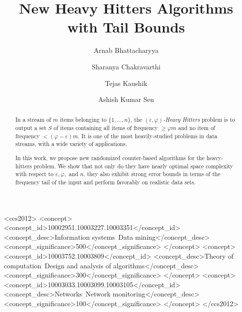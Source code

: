 \documentclass[sigconf,review=true,anonymous=true,screen]{acmart}
\newcommand{\eps}{\varepsilon}
\renewcommand{\phi}{\varphi}
\begin{document}
%
\title{New Heavy Hitters Algorithms with Tail Bounds}

%
\author{Arnab Bhattacharyya}
\author{Sharanya Chakravarthi}
\author{Tejas Kaushik}
\author{Ashish Kumar Sen}
%
\renewcommand{\shortauthors}{Bhattacharyya et al.}

%
\begin{abstract}
In a stream of $m$ items belonging to $\{1, \dots, n\}$, the {\em $(\eps, \phi)$-Heavy Hitters} problem is to output a set $S$ of items containing all items of frequency $\geq \phi m$ and no item of frequency $< (\phi-\eps)m$. It is one of the most heavily-studied problems in data streams, with a wide variety of applications. 

In this work, we propose new randomized counter-based algorithms for the heavy-hitters problem. We show that not only do they have nearly optimal space complexity with respect to $\eps, \phi,$ and $n$, they also exhibit strong error bounds in terms of the frequency tail of the input and perform favorably on realistic data sets.
\end{abstract}

%
%
\begin{CCSXML}
<ccs2012>
<concept>
<concept_id>10002951.10003227.10003351</concept_id>
<concept_desc>Information systems~Data mining</concept_desc>
<concept_significance>500</concept_significance>
</concept>
<concept>
<concept_id>10003752.10003809</concept_id>
<concept_desc>Theory of computation~Design and analysis of algorithms</concept_desc>
<concept_significance>300</concept_significance>
</concept>
<concept>
<concept_id>10003033.10003099.10003105</concept_id>
<concept_desc>Networks~Network monitoring</concept_desc>
<concept_significance>100</concept_significance>
</concept>
</ccs2012>
\end{CCSXML}
\end{document}
